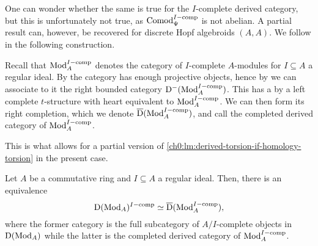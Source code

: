 One can wonder whether the same is true for the $I$-complete derived category, but this is unfortunately not true, as $\mathrm{Comod}_\Psi^{I-\mathrm{comp}}$ is not abelian. A partial result can, however, be recovered for discrete Hopf algebroids $(A, A)$. We follow \cite{barthel-heard-valenzuela_2020} in the following construction. 

\begin{construction}
    \label{ch0:const:completed-derived-category}
    Recall that $\mathrm{Mod}_A^{I-\mathrm{comp}}$ denotes the category of $I$-complete $A$-modules for $I\subseteq A$ a regular ideal. By \cite[2.11]{barthel-heard-valenzuela_2020} the category has enough projective objects, hence by \cite[1.3.2]{Lurie_HA} we can associate to it the right bounded category $\mathrm{D}^-(\mathrm{Mod}_A^{I-\mathrm{comp}})$. This has a by \cite[1.3.2.19, 1.3.3.16]{Lurie_HA} a left complete $t$-structure with heart equivalent to $\mathrm{Mod}_A^{I-\mathrm{comp}}$. We can then form its right completion, which we denote $\overline{\mathrm{D}}(\mathrm{Mod}_A^{I-\mathrm{comp}})$, and call the completed derived category of $\mathrm{Mod}_A^{I-\mathrm{comp}}$. 
\end{construction}

This is what allows for a partial version of \cref{ch0:lm:derived-torsion-if-homology-torsion} in the present case. 

\begin{proposition}
    \label{ch0:prop:pulling-out-completion}
    Let $A$ be a commutative ring and $I\subseteq A$ a regular ideal. Then, there is an equivalence 
    \[\mathrm{D}(\mathrm{Mod}_A)^{I-\mathrm{comp}}\simeq \overline{\mathrm{D}}(\mathrm{Mod}_A^{I-\mathrm{comp}}),\]
    where the former category is the full subcategory of $A/I$-complete objects in $\mathrm{D}(\mathrm{Mod}_A)$ while the latter is the completed derived category of $\mathrm{Mod}_A^{I-\mathrm{comp}}$. 
\end{proposition}











